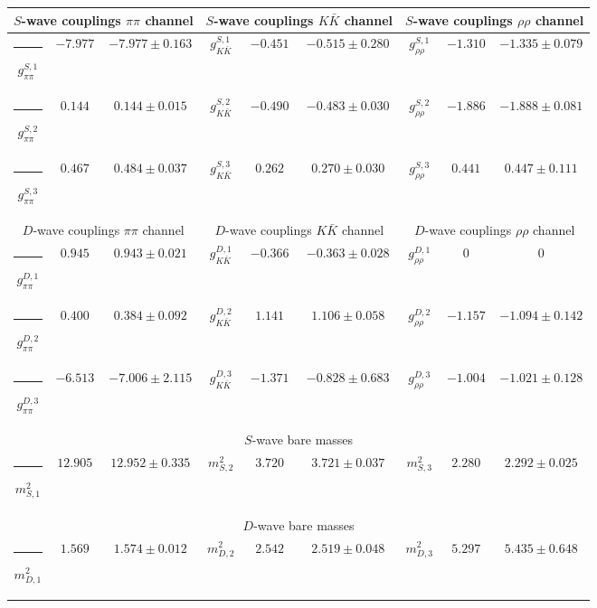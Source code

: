 \begin{table}[h]
\begin{ruledtabular}
\begin{tabular}{c c c c c c c c c}
\multicolumn{3}{c}{$S$-wave couplings $\pi \pi$ channel}  & \multicolumn{3}{c}{$S$-wave couplings $K  \bar K$ channel} & \multicolumn{3}{c}{$S$-wave couplings $\rho\rho$ channel} \\ \hline
\rule[-0.2cm]{-0.1cm}{.55cm} $g^{S,1}_{\pi\pi}$ & $-7.977$ & $-7.977 \pm 0.163$ & $g^{S,1}_{K\bar K}$ & $-0.451$ & $-0.515 \pm 0.280$ & $g^{S,1}_{\rho\rho}$ & $-1.310$ & $-1.335 \pm 0.079$ \\
\rule[-0.2cm]{-0.1cm}{.55cm} $g^{S,2}_{\pi\pi}$ & $0.144$ & $0.144 \pm 0.015$ & $g^{S,2}_{K\bar K}$ & $-0.490$ & $-0.483 \pm 0.030$ & $g^{S,2}_{\rho\rho}$ & $-1.886$ & $-1.888 \pm 0.081$ \\
\rule[-0.2cm]{-0.1cm}{.55cm} $g^{S,3}_{\pi\pi}$ & $0.467$ & $0.484 \pm 0.037$ & $g^{S,3}_{K\bar K}$ & $0.262$ & $0.270 \pm 0.030$ & $g^{S,3}_{\rho\rho}$ & $0.441$ & $0.447 \pm 0.111$ \\
\hline 
\multicolumn{3}{c}{$D$-wave couplings $\pi \pi$ channel}  & \multicolumn{3}{c}{$D$-wave couplings $K  \bar K$ channel} & \multicolumn{3}{c}{$D$-wave couplings $\rho\rho$ channel} \\ \hline
\rule[-0.2cm]{-0.1cm}{.55cm} $g^{D,1}_{\pi\pi}$ & $0.945$ & $0.943 \pm 0.021$ & $g^{D,1}_{K\bar K}$ & $-0.366$ & $-0.363 \pm 0.028$ & $g^{D,1}_{\rho\rho}$ & $0$ & $0$ \\
\rule[-0.2cm]{-0.1cm}{.55cm} $g^{D,2}_{\pi\pi}$ & $0.400$ & $0.384 \pm 0.092$ & $g^{D,2}_{K\bar K}$ & $1.141$ & $1.106 \pm 0.058$ & $g^{D,2}_{\rho\rho}$ & $-1.157$ & $-1.094 \pm 0.142$ \\
\rule[-0.2cm]{-0.1cm}{.55cm} $g^{D,3}_{\pi\pi}$ & $-6.513$ & $-7.006 \pm 2.115$ & $g^{D,3}_{K\bar K}$ & $-1.371$ & $-0.828 \pm 0.683$ & $g^{D,3}_{\rho\rho}$ & $-1.004$ & $-1.021 \pm 0.128$ \\
\hline 
\multicolumn{9}{c}{$S$-wave bare masses}   \\ \hline
\rule[-0.2cm]{-0.1cm}{.55cm} $m^2_{S,1}$ & $12.905$ & $12.952 \pm 0.335$ & $m^2_{S,2}$ & $3.720$ & $3.721 \pm 0.037$ & $m^2_{S,3}$ & $2.280$ & $2.292 \pm 0.025$ \\
\hline 
\multicolumn{9}{c}{$D$-wave bare masses}   \\ \hline
\rule[-0.2cm]{-0.1cm}{.55cm} $m^2_{D,1}$ & $1.569$ & $1.574 \pm 0.012$ & $m^2_{D,2}$ & $2.542$ & $2.519 \pm 0.048$ & $m^2_{D,3}$ & $5.297$ & $5.435 \pm 0.648$ \\

\end{tabular}
\end{ruledtabular}
\end{table}
